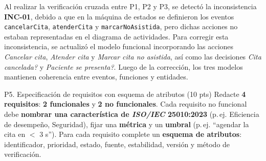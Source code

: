 \documentclass[11pt,a4paper,oneside]{article}
\begin{document}
\begin{center}
\end{center}

Al realizar la verificaci\'on cruzada entre P1, P2 y P3, se detect\'o la inconsistencia \textbf{INC-01}, debido a que en la m\'aquina de estados se definieron los eventos \texttt{cancelarCita}, \texttt{atenderCita} y \texttt{marcarNoAsistida}, pero dichas acciones no estaban representadas en el diagrama de actividades. Para corregir esta inconsistencia, se actualiz\'o el modelo funcional incorporando las acciones \textit{Cancelar cita}, \textit{Atender cita} y \textit{Marcar cita no asistida}, as\'i como las decisiones \textit{\textquestiondown Cita cancelada?} y \textit{\textquestiondown Paciente se presenta?}. Luego de la correcci\'on, los tres modelos mantienen coherencia entre eventos, funciones y entidades.

\begin{tarea}{P5. Especificaci\'on de requisitos con esquema de atributos \hfill (10 pts)}
Redacte \textbf{4 requisitos}: \textbf{2 funcionales} y \textbf{2 no funcionales}. Cada requisito no funcional debe \textbf{nombrar una caracter\'istica de \textit{ISO/IEC} 25010:2023} (p.\,ej. Eficiencia de desempe\~no, Seguridad), fijar una \textbf{m\'etrica} y un \textbf{umbral} (p.\,ej. ``agendar la cita en $<$ 3 s''). Para cada requisito complete un \textbf{esquema de atributos}: identificador, prioridad, estado, fuente, estabilidad, versi\'on y m\'etodo de verificaci\'on.
\end{tarea}
\end{document}
